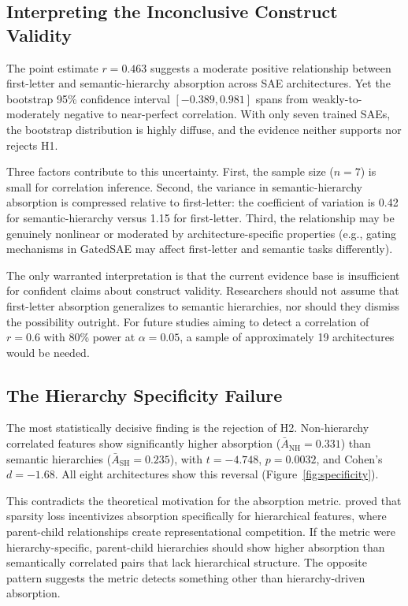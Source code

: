 \documentclass{article}
\begin{document}
\subsection{Interpreting the Inconclusive Construct Validity}

The point estimate $r = 0.463$ suggests a moderate positive relationship between first-letter and semantic-hierarchy absorption across SAE architectures. Yet the bootstrap 95\% confidence interval $[-0.389, 0.981]$ spans from weakly-to-moderately negative to near-perfect correlation. With only seven trained SAEs, the bootstrap distribution is highly diffuse, and the evidence neither supports nor rejects H1.

Three factors contribute to this uncertainty. First, the sample size ($n = 7$) is small for correlation inference. Second, the variance in semantic-hierarchy absorption is compressed relative to first-letter: the coefficient of variation is 0.42 for semantic-hierarchy versus 1.15 for first-letter. Third, the relationship may be genuinely nonlinear or moderated by architecture-specific properties (e.g., gating mechanisms in GatedSAE may affect first-letter and semantic tasks differently).

The only warranted interpretation is that the current evidence base is insufficient for confident claims about construct validity. Researchers should not assume that first-letter absorption generalizes to semantic hierarchies, nor should they dismiss the possibility outright. For future studies aiming to detect a correlation of $r = 0.6$ with 80\% power at $\alpha = 0.05$, a sample of approximately 19 architectures would be needed.

\subsection{The Hierarchy Specificity Failure}

The most statistically decisive finding is the rejection of H2. Non-hierarchy correlated features show significantly higher absorption ($\bar{A}_{\text{NH}} = 0.331$) than semantic hierarchies ($\bar{A}_{\text{SH}} = 0.235$), with $t = -4.748$, $p = 0.0032$, and Cohen's $d = -1.68$. All eight architectures show this reversal (Figure~\ref{fig:specificity}).

This contradicts the theoretical motivation for the absorption metric. \citet{chanin2024feature} proved that sparsity loss incentivizes absorption specifically for hierarchical features, where parent-child relationships create representational competition. If the metric were hierarchy-specific, parent-child hierarchies should show higher absorption than semantically correlated pairs that lack hierarchical structure. The opposite pattern suggests the metric detects something other than hierarchy-driven absorption.
\end{document}

